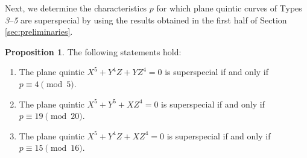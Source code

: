 \documentclass{article}
\theoremstyle{definition}
\newtheorem{Prop}[Def]{Proposition}
\begin{document}
Next, we determine the characteristics $p$ for which plane quintic curves of Types \hspace{-0.2mm}\textit{3}--\textit{5} are superspecial by using the results obtained in the first half of Section \ref{sec:preliminaries}.\vspace{-1mm}
\begin{Prop}\label{prop:type3-5}
The following statements hold:\vspace{-0.6mm}
\begin{enumerate}
\item[(1)] The plane quintic $X^5+Y^4Z+YZ^4 = 0$ is superspecial if and only if $p \equiv 4 \pmod{5}$.\vspace{-2.6mm}
\item[(2)] The plane quintic $X^5+Y^5+XZ^4 = 0$ is superspecial if and only if $p \equiv 19 \pmod{20}$.\vspace{-2.6mm}
\item[(3)] The plane quintic $X^5+Y^4Z+XZ^4 = 0$ is superspecial if and only if $p \equiv 15 \pmod{16}$.\vspace{0.3mm}
\end{enumerate}
\end{Prop}
\end{document}
